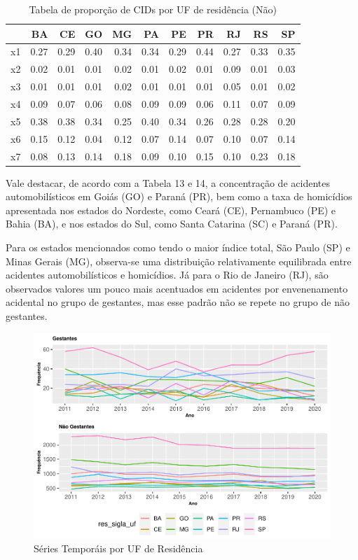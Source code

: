 \documentclass[
]{article}
\begin{document}
\begin{table}

\caption{\label{tab:unnamed-chunk-11}Tabela de proporção de CIDs por UF de residência  (Não)}
\centering
\begin{tabular}[t]{l|r|r|r|r|r|r|r|r|r|r}
\hline
  & BA & CE & GO & MG & PA & PE & PR & RJ & RS & SP\\
\hline
x1 & 0.27 & 0.29 & 0.40 & 0.34 & 0.34 & 0.29 & 0.44 & 0.27 & 0.33 & 0.35\\
\hline
x2 & 0.02 & 0.01 & 0.01 & 0.02 & 0.01 & 0.02 & 0.01 & 0.09 & 0.01 & 0.03\\
\hline
x3 & 0.01 & 0.01 & 0.01 & 0.02 & 0.01 & 0.01 & 0.01 & 0.05 & 0.01 & 0.02\\
\hline
x4 & 0.09 & 0.07 & 0.06 & 0.08 & 0.09 & 0.09 & 0.06 & 0.11 & 0.07 & 0.09\\
\hline
x5 & 0.38 & 0.38 & 0.34 & 0.25 & 0.40 & 0.34 & 0.26 & 0.28 & 0.28 & 0.20\\
\hline
x6 & 0.15 & 0.12 & 0.04 & 0.12 & 0.07 & 0.14 & 0.07 & 0.10 & 0.07 & 0.14\\
\hline
x7 & 0.08 & 0.13 & 0.14 & 0.18 & 0.09 & 0.10 & 0.15 & 0.10 & 0.23 & 0.18\\
\hline
\end{tabular}
\end{table}

Vale destacar, de acordo com a Tabela 13 e 14, a concentração de
acidentes automobilísticos em Goiás (GO) e Paraná (PR), bem como a taxa
de homicídios apresentada nos estados do Nordeste, como Ceará (CE),
Pernambuco (PE) e Bahia (BA), e nos estados do Sul, como Santa Catarina
(SC) e Paraná (PR).

Para os estados mencionados como tendo o maior índice total, São Paulo
(SP) e Minas Gerais (MG), observa-se uma distribuição relativamente
equilibrada entre acidentes automobilísticos e homicídios. Já para o Rio
de Janeiro (RJ), são observados valores um pouco mais acentuados em
acidentes por envenenamento acidental no grupo de gestantes, mas esse
padrão não se repete no grupo de não gestantes.

\begin{figure}
\centering
\includegraphics{RelatorioV01_files/figure-latex/unnamed-chunk-12-1.pdf}
\caption{Séries Temporáis por UF de Residência}
\end{figure}
\end{document}
